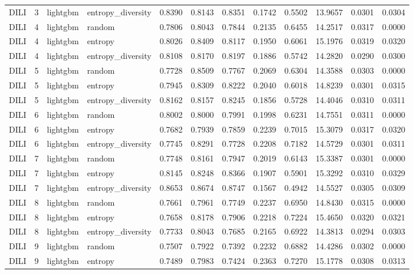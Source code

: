 \begin{tabular}{lrllrrrrrrrr}
DILI & 3 & lightgbm & entropy_diversity & 0.8390 & 0.8143 & 0.8351 & 0.1742 & 0.5502 & 13.9657 & 0.0301 & 0.0304 \\
DILI & 4 & lightgbm & random & 0.7806 & 0.8043 & 0.7844 & 0.2135 & 0.6455 & 14.2517 & 0.0317 & 0.0000 \\
DILI & 4 & lightgbm & entropy & 0.8026 & 0.8409 & 0.8117 & 0.1950 & 0.6061 & 15.1976 & 0.0319 & 0.0320 \\
DILI & 4 & lightgbm & entropy_diversity & 0.8108 & 0.8170 & 0.8197 & 0.1886 & 0.5742 & 14.2820 & 0.0290 & 0.0300 \\
DILI & 5 & lightgbm & random & 0.7728 & 0.8509 & 0.7767 & 0.2069 & 0.6304 & 14.3588 & 0.0303 & 0.0000 \\
DILI & 5 & lightgbm & entropy & 0.7945 & 0.8309 & 0.8222 & 0.2040 & 0.6018 & 14.8239 & 0.0301 & 0.0315 \\
DILI & 5 & lightgbm & entropy_diversity & 0.8162 & 0.8157 & 0.8245 & 0.1856 & 0.5728 & 14.4046 & 0.0310 & 0.0311 \\
DILI & 6 & lightgbm & random & 0.8002 & 0.8000 & 0.7991 & 0.1998 & 0.6231 & 14.7551 & 0.0311 & 0.0000 \\
DILI & 6 & lightgbm & entropy & 0.7682 & 0.7939 & 0.7859 & 0.2239 & 0.7015 & 15.3079 & 0.0317 & 0.0320 \\
DILI & 6 & lightgbm & entropy_diversity & 0.7745 & 0.8291 & 0.7728 & 0.2208 & 0.7182 & 14.5729 & 0.0301 & 0.0311 \\
DILI & 7 & lightgbm & random & 0.7748 & 0.8161 & 0.7947 & 0.2019 & 0.6143 & 15.3387 & 0.0301 & 0.0000 \\
DILI & 7 & lightgbm & entropy & 0.8145 & 0.8248 & 0.8366 & 0.1907 & 0.5901 & 15.3292 & 0.0310 & 0.0329 \\
DILI & 7 & lightgbm & entropy_diversity & 0.8653 & 0.8674 & 0.8747 & 0.1567 & 0.4942 & 14.5527 & 0.0305 & 0.0309 \\
DILI & 8 & lightgbm & random & 0.7661 & 0.7961 & 0.7749 & 0.2237 & 0.6950 & 14.8430 & 0.0315 & 0.0000 \\
DILI & 8 & lightgbm & entropy & 0.7658 & 0.8178 & 0.7906 & 0.2218 & 0.7224 & 15.4650 & 0.0320 & 0.0321 \\
DILI & 8 & lightgbm & entropy_diversity & 0.7733 & 0.8043 & 0.7685 & 0.2165 & 0.6922 & 14.3813 & 0.0294 & 0.0303 \\
DILI & 9 & lightgbm & random & 0.7507 & 0.7922 & 0.7392 & 0.2232 & 0.6882 & 14.4286 & 0.0302 & 0.0000 \\
DILI & 9 & lightgbm & entropy & 0.7489 & 0.7983 & 0.7424 & 0.2363 & 0.7270 & 15.1778 & 0.0308 & 0.0313 \\

\end{tabular}
